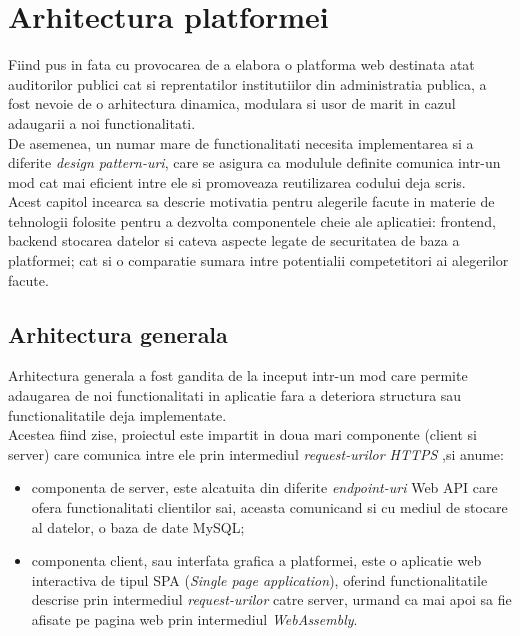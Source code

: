 \chapter{Arhitectura platformei}
Fiind pus in fata cu provocarea de a elabora o platforma web destinata atat auditorilor publici cat si reprentatilor institutiilor din administratia publica, a fost nevoie de o arhitectura dinamica, modulara si usor de marit in cazul adaugarii a noi functionalitati.\\
De asemenea, un numar mare de functionalitati necesita implementarea si a diferite \textit{design pattern-uri}, care se asigura ca modulule definite comunica intr-un mod cat mai eficient intre ele si promoveaza reutilizarea codului deja scris.\\
Acest capitol incearca sa descrie motivatia pentru alegerile facute in materie de tehnologii folosite pentru a dezvolta componentele cheie ale aplicatiei: frontend, backend stocarea datelor si cateva aspecte legate de securitatea de baza a platformei; cat si o comparatie sumara intre potentialii competetitori ai alegerilor facute.

\section {Arhitectura generala}
Arhitectura generala a fost gandita de la inceput intr-un mod care permite adaugarea de noi functionalitati in aplicatie fara a deteriora structura sau functionalitatile deja implementate.\\
Acestea fiind zise, proiectul este impartit in doua mari componente (client si server)  care comunica intre ele prin intermediul \textit{request-urilor HTTPS} ,si anume:

\begin{itemize}
	
	\item componenta de server, este alcatuita din diferite \textit{endpoint-uri}  Web API care ofera functionalitati clientilor sai, aceasta comunicand si cu mediul de stocare al datelor, o baza de date MySQL;
	
	\item componenta client, sau interfata grafica a platformei, este o aplicatie web interactiva de tipul SPA (\textit{Single page application}), oferind functionalitatile descrise prin intermediul \textit{request-urilor} catre server, urmand ca mai apoi sa fie afisate pe pagina web prin intermediul \textit{WebAssembly}.
\end{itemize}  

